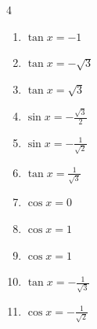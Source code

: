 \begin{multicols}{4}
\begin{enumerate}

  \item $\displaystyle \tan{x}  = -1$


  \item $\displaystyle \tan{x}  = -\sqrt{3}$


  \item $\displaystyle \tan{x}  = \sqrt{3}$


  \item $\displaystyle \sin{x}  = -\frac{\sqrt{3}}{2}$


  \item $\displaystyle \sin{x}  = -\frac{1}{\sqrt{2}}$


  \item $\displaystyle \tan{x}  = \frac{1}{\sqrt{3}}$


\columnbreak %

  \item $\displaystyle \cos{x}  = 0$


  \item $\displaystyle \cos{x}  = 1$


  \item $\displaystyle \cos{x}  = 1$


  \item $\displaystyle \tan{x}  = -\frac{1}{\sqrt{3}}$


  \item $\displaystyle \cos{x}  = -\frac{1}{\sqrt{2}}$



\end{enumerate}
\end{multicols}
